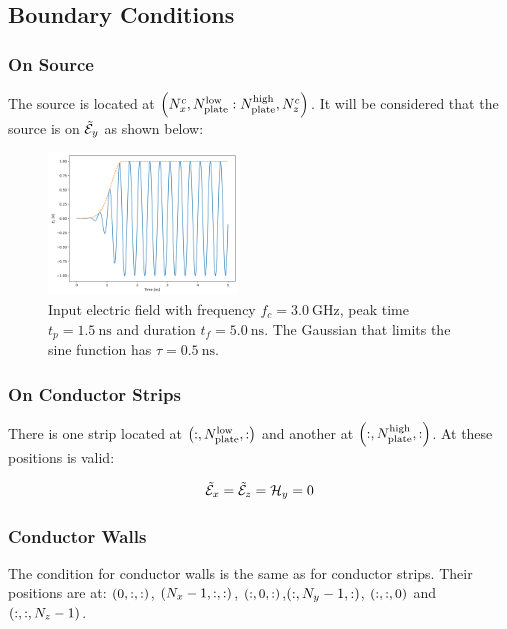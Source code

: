\subsection{Boundary Conditions}

\subsubsection{On Source} \hfill

The source is located at $\pare{N_x^c, N_{\textnormal{plate}}^{\textnormal{low}} : N_{\textnormal{plate}}^{\textnormal{high}}, N_z^c}$. It will be considered that the source is on $\tilde{\mathcal{E}}_y$ as shown below: 

\begin{figure}[H]
    \centering
    \includegraphics[width=0.45\textwidth]{contents/input_source.png}
    \caption{Input electric field with frequency $f_c = \SI{3.0}{\giga\hertz}$, peak time $t_p = \SI{1.5}{\nano\second}$ and duration $t_f = \SI{5.0}{\nano\second}$. The Gaussian that limits the sine function has $\tau = \SI{0.5}{\nano\second}$.}
\end{figure}

\subsubsection{On Conductor Strips}\hfill

There is one strip located at $\pare{:, N_{\textnormal{plate}}^{\textnormal{low}}, :}$ and another at $\pare{:, N_{\textnormal{plate}}^{\textnormal{high}}, :}$. At these positions is valid:

\begin{align}
    \tilde{\mathcal{E}}_x = \tilde{\mathcal{E}}_z = \mathcal{H}_y = 0
\end{align}

\subsubsection{Conductor Walls}\hfill

The condition for conductor walls is the same as for conductor strips. Their positions are at: $\pare{0, :, :}$, $\pare{N_x-1, :, :}$, $\pare{:, 0, :}$,$\pare{:, N_y-1, :}$, $\pare{:, :, 0}$ and $\pare{:, :, N_z-1}$.

